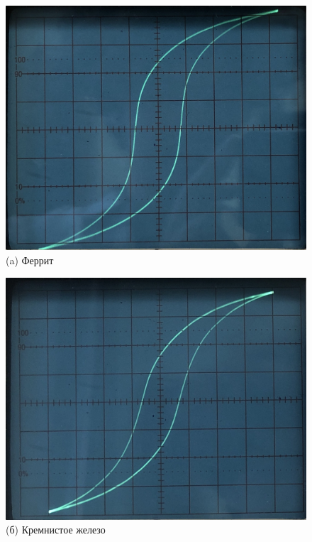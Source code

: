 \documentclass[12pt,a4paper]{article}
\begin{document}
\begin{figure}[H]
	\centering	
	\begin{minipage}{0.33\linewidth}
		\centering
		\includegraphics[width=0.9\linewidth]{pics/pred_ferrit.JPG}
		(a) Феррит
	\end{minipage}
	\begin{minipage}{0.33\linewidth}
		\centering
		\includegraphics[width=0.9\linewidth]{pics/pred_sife.jpg}
		(б) Кремнистое железо
	\end{minipage}


\end{figure}
\end{document}
